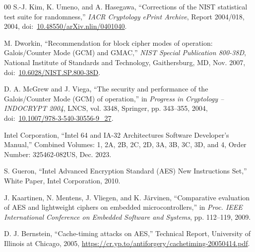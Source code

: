 \documentclass[10pt,twocolumn]{article}
\begin{document}
\begin{thebibliography}{00}
S.-J. Kim, K. Umeno, and A. Hasegawa, ``Corrections of the NIST statistical test suite for randomness,'' \textit{IACR Cryptology ePrint Archive}, Report 2004/018, 2004, doi:~\href{https://doi.org/10.48550/arXiv.nlin/0401040}{10.48550/arXiv.nlin/0401040}.

M. Dworkin, ``Recommendation for block cipher modes of operation: Galois/Counter Mode (GCM) and GMAC,'' \textit{NIST Special Publication 800-38D}, National Institute of Standards and Technology, Gaithersburg, MD, Nov. 2007, doi:~\href{https://doi.org/10.6028/NIST.SP.800-38D}{10.6028/NIST.SP.800-38D}.

D. A. McGrew and J. Viega, ``The security and performance of the Galois/Counter Mode (GCM) of operation,'' in \textit{Progress in Cryptology -- INDOCRYPT 2004}, LNCS, vol. 3348, Springer, pp. 343--355, 2004, doi:~\href{https://doi.org/10.1007/978-3-540-30556-9_27}{10.1007/978-3-540-30556-9\_27}.

Intel Corporation, ``Intel 64 and IA-32 Architectures Software Developer's Manual,'' Combined Volumes: 1, 2A, 2B, 2C, 2D, 3A, 3B, 3C, 3D, and 4, Order Number: 325462-082US, Dec. 2023.

S. Gueron, ``Intel Advanced Encryption Standard (AES) New Instructions Set,'' White Paper, Intel Corporation, 2010.

J. Kaartinen, N. Mentens, J. Vliegen, and K. J{\"a}rvinen, ``Comparative evaluation of AES and lightweight ciphers on embedded microcontrollers,'' in \textit{Proc. IEEE International Conference on Embedded Software and Systems}, pp. 112--119, 2009.

D. J. Bernstein, ``Cache-timing attacks on AES,'' Technical Report, University of Illinois at Chicago, 2005, \url{https://cr.yp.to/antiforgery/cachetiming-20050414.pdf}.

\end{thebibliography}
\end{document}
